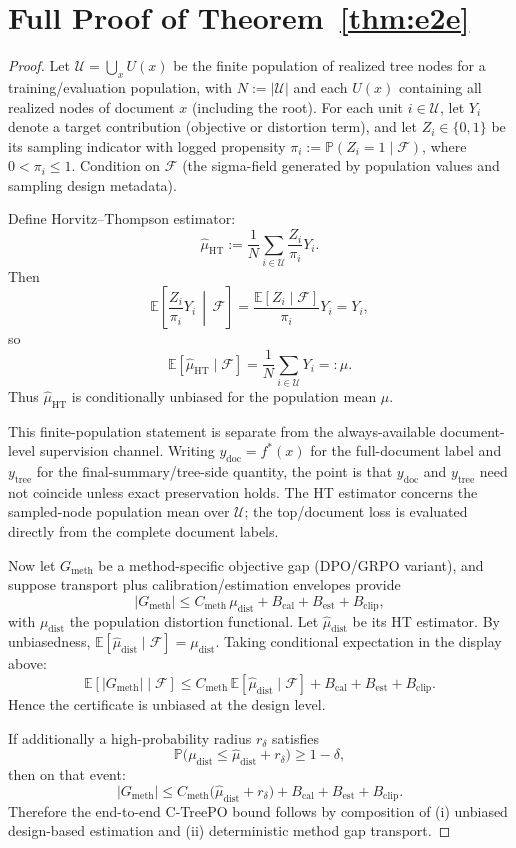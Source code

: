 \documentclass[11pt]{article}
\newcommand{\E}{\mathbb{E}}
\newcommand{\Prob}{\mathbb{P}}
\begin{document}
\section{Full Proof of Theorem~\ref{thm:e2e}}\label{app:proof-e2e}

\begin{proof}
Let $\mathcal{U}=\bigcup_x U(x)$ be the finite population of realized tree nodes for a training/evaluation population, with $N:=|\mathcal{U}|$ and each $U(x)$ containing all realized nodes of document $x$ (including the root).
For each unit $i\in\mathcal{U}$, let $Y_i$ denote a target contribution (objective or distortion term), and let $Z_i\in\{0,1\}$ be its sampling indicator with logged propensity
$\pi_i:=\Prob(Z_i=1\mid\mathcal{F})$, where $0<\pi_i\le1$.
Condition on $\mathcal{F}$ (the sigma-field generated by population values and sampling design metadata).

Define Horvitz--Thompson estimator:
\[
\widehat{\mu}_{\mathrm{HT}}:=\frac{1}{N}\sum_{i\in\mathcal{U}}\frac{Z_i}{\pi_i}Y_i.
\]
Then
\[
\E\left[\frac{Z_i}{\pi_i}Y_i\,\middle|\,\mathcal{F}\right]
=\frac{\E[Z_i\mid\mathcal{F}]}{\pi_i}Y_i
=Y_i,
\]
so
\[
\E[\widehat{\mu}_{\mathrm{HT}}\mid\mathcal{F}]
=\frac{1}{N}\sum_{i\in\mathcal{U}}Y_i
=:\mu.
\]
Thus $\widehat{\mu}_{\mathrm{HT}}$ is conditionally unbiased for the population mean $\mu$.

This finite-population statement is separate from the always-available document-level supervision channel. Writing $y_{\mathrm{doc}}=f^\ast(x)$ for the full-document label and $y_{\mathrm{tree}}$ for the final-summary/tree-side quantity, the point is that $y_{\mathrm{doc}}$ and $y_{\mathrm{tree}}$ need not coincide unless exact preservation holds. The HT estimator concerns the sampled-node population mean over $\mathcal{U}$; the top/document loss is evaluated directly from the complete document labels.

Now let $G_{\mathrm{meth}}$ be a method-specific objective gap (DPO/GRPO variant), and suppose transport plus calibration/estimation envelopes provide
\[
|G_{\mathrm{meth}}|
\le C_{\mathrm{meth}}\,\mu_{\mathrm{dist}} + B_{\mathrm{cal}}+B_{\mathrm{est}}+B_{\mathrm{clip}},
\]
with $\mu_{\mathrm{dist}}$ the population distortion functional.
Let $\widehat{\mu}_{\mathrm{dist}}$ be its HT estimator.
By unbiasedness, $\E[\widehat{\mu}_{\mathrm{dist}}\mid\mathcal{F}]=\mu_{\mathrm{dist}}$.
Taking conditional expectation in the display above:
\[
\E[|G_{\mathrm{meth}}|\mid\mathcal{F}]
\le C_{\mathrm{meth}}\,\E[\widehat{\mu}_{\mathrm{dist}}\mid\mathcal{F}]
+B_{\mathrm{cal}}+B_{\mathrm{est}}+B_{\mathrm{clip}}.
\]
Hence the certificate is unbiased at the design level.

If additionally a high-probability radius $r_\delta$ satisfies
\[
\Prob\big(\mu_{\mathrm{dist}}\le\widehat{\mu}_{\mathrm{dist}}+r_\delta\big)\ge1-\delta,
\]
then on that event:
\[
|G_{\mathrm{meth}}|
\le C_{\mathrm{meth}}\big(\widehat{\mu}_{\mathrm{dist}}+r_\delta\big)
+B_{\mathrm{cal}}+B_{\mathrm{est}}+B_{\mathrm{clip}}.
\]
Therefore the end-to-end C-TreePO bound follows by composition of
(i) unbiased design-based estimation and
(ii) deterministic method gap transport.
\end{proof}
\end{document}
